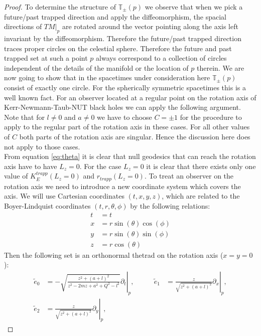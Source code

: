 \documentclass[reqno]{amsart}
\numberwithin{equation}{section}
\theoremstyle{plain}
\theoremstyle{definition}
\begin{document}
\begin{proof}To determine the structure of $\mathbb{T}_\pm(p)$ we observe that when we pick a future/past trapped direction and apply the diffeomorphism, the spacial directions of $TM|_p$ are rotated around the vector pointing along the axis left invariant by the diffeomorphism. Therefore the future/past trapped direction traces proper circles on the celestial sphere. Therefore the future and past trapped set at such a point $p$ always correspond to a collection of circles independent of the details of the manifold or the location of $p$ therein. We are now going to show that in the spacetimes under consideration here $\mathbb{T}_\pm(p)$ consist of exactly one circle. For the spherically symmetric spacetimes this is a well known fact. For an observer located at a regular point on the rotation axis of Kerr-Newmann-Taub-NUT black holes we can apply the following argument. Note that for $l\neq0$ and $a\neq0$ we have to choose $C=\pm1$ for the procedure to apply to the regular part of the rotation axis in these cases. For all other values of $C$ both parts of the rotation axis are singular. Hence the discussion here does not apply to those cases.\\
From equation \eqref{eq:theta} it is clear that null geodesics that can reach the rotation axis have to have $L_z=0$. For the case $L_z=0$ it is clear that there exists only one value of $K_E^{trapp}(L_z=0)$ and $r_{trapp}(L_z=0)$. To treat an observer on the rotation axis we need to introduce a new coordinate system which covers the axis. We will use Cartesian coordinates $(t, x, y, z)$, which are related to the Boyer-Lindquist coordinates $(t, r, \theta, \phi)$ by the following relations:
\begin{equation}
\begin{aligned}
t &= t \\
x &= r \sin(\theta) \cos(\phi) \\
y &= r \sin(\theta) \sin(\phi) \\
z &= r \cos(\theta) 
\end{aligned}
\end{equation}
Then the following set is an orthonormal thetrad on the rotation axis ($x=y=0$):
\begin{align}\label{eq:tetradct}
\tilde e_0 &= \left.-\sqrt{\frac{z^2+(a+l)^2}{z^2-2m z +a^2 + Q^2-l^2 }} \partial_t \right|_p ,&\qquad 
\tilde e_1&=\left. \frac{z}{\sqrt{z^2+(a+l)^2}}\partial_x \right|_p, \\ \nonumber
\tilde e_2&=\left. \frac{z}{\sqrt{z^2+(a+l)^2}}\partial_y \right|_p,&\qquad 

\end{align}
\end{proof}
\end{document}
